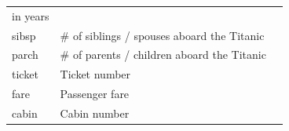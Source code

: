 \documentclass[11pt]{article}
\begin{document}
\begin{longtable}[]{@{}lll@{}}
\begin{minipage}[t]{0.18\columnwidth}
in years\strut
\end{minipage}\tabularnewline
\begin{minipage}[t]{0.18\columnwidth}\raggedright\strut
sibsp\strut
\end{minipage} & \begin{minipage}[t]{0.18\columnwidth}\raggedright\strut
\# of siblings / spouses aboard the Titanic\strut
\end{minipage} & \begin{minipage}[t]{0.18\columnwidth}\raggedright\strut
\strut
\end{minipage}\tabularnewline
\begin{minipage}[t]{0.18\columnwidth}\raggedright\strut
parch\strut
\end{minipage} & \begin{minipage}[t]{0.18\columnwidth}\raggedright\strut
\# of parents / children aboard the Titanic\strut
\end{minipage} & \begin{minipage}[t]{0.18\columnwidth}\raggedright\strut
\strut
\end{minipage}\tabularnewline
\begin{minipage}[t]{0.18\columnwidth}\raggedright\strut
ticket\strut
\end{minipage} & \begin{minipage}[t]{0.18\columnwidth}\raggedright\strut
Ticket number\strut
\end{minipage} & \begin{minipage}[t]{0.18\columnwidth}\raggedright\strut
\strut
\end{minipage}\tabularnewline
\begin{minipage}[t]{0.18\columnwidth}\raggedright\strut
fare\strut
\end{minipage} & \begin{minipage}[t]{0.18\columnwidth}\raggedright\strut
Passenger fare\strut
\end{minipage} & \begin{minipage}[t]{0.18\columnwidth}\raggedright\strut
\strut
\end{minipage}\tabularnewline
\begin{minipage}[t]{0.18\columnwidth}\raggedright\strut
cabin\strut
\end{minipage} & \begin{minipage}[t]{0.18\columnwidth}\raggedright\strut
Cabin number\strut
\end{minipage} & \begin{minipage}[t]{0.18\columnwidth}\raggedright\strut

\end{minipage}
\end{longtable}
\end{document}
